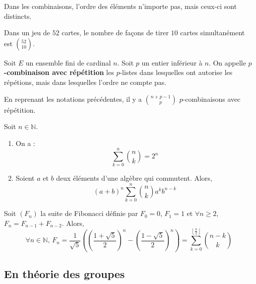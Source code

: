   \begin{remark}
    Dans les combinaisons, l'ordre des éléments n'importe pas, mais ceux-ci sont distincts.
  \end{remark}

  \begin{example}
    Dans un jeu de $52$ cartes, le nombre de façons de tirer $10$ cartes simultanément est $\binom{52}{10}$.
  \end{example}

  \begin{definition}
    Soit $E$ un ensemble fini de cardinal $n$. Soit $p$ un entier inférieur à $n$. On appelle \textbf{$p$-combinaison avec répétition} les $p$-listes dans lesquelles ont autorise les répétions, mais dans lesquelles l'ordre ne compte pas.
  \end{definition}

  \begin{proposition}
    En reprenant les notations précédentes, il y a $\binom{n+p-1}{p}$ $p$-combinaisons avec répétition.
  \end{proposition}

  \begin{proposition}
    Soit $n \in \mathbb{N}$.
    \begin{enumerate}[label={\bfseries(\roman*)}]
      \item On a :
      \[ \sum_{k = 0}^n \binom{n}{k} = 2^n \]
      \item Soient $a$ et $b$ deux éléments d'une algèbre qui commutent. Alors,
      \[ (a+b)^n \sum_{k = 0}^n \binom{n}{k} a^k b^{n-k} \]
    \end{enumerate}
  \end{proposition}


  \begin{application}
    Soit $(F_n)$ la suite de Fibonacci définie par $F_0 = 0$, $F_1 = 1$ et $\forall n \geq 2$, $F_n = F_{n-1} + F_{n-2}$. Alors,
    \[ \forall n \in \mathbb{N}, \, F_n = \frac{1}{\sqrt{5}} \left ( \left ( \frac{1 + \sqrt{5}}{2} \right)^n - \left ( \frac{1 - \sqrt{5}}{2} \right)^n \right) = \sum_{k=0}^{\left\lfloor \frac{n}{2} \right\rfloor} \binom{n-k}{k} \]
  \end{application}

  \subsection{En théorie des groupes}

